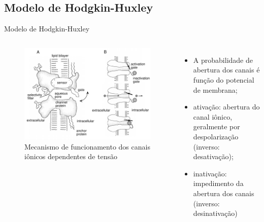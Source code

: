 \subsection{Modelo de Hodgkin-Huxley}
\begin{frame}{Modelo de Hodgkin-Huxley}
	\begin{columns}[t]
		\column{5cm}
			\begin{figure}[htb!]
				\centering
				\caption{Mecanismo de funcionamento dos canais iônicos dependentes de tensão}
				\label{fig:canais}
				\includegraphics[width=0.9\linewidth]{figs/canais}
			\end{figure}
		\column{5cm}
		\begin{itemize}
			\item A probabilidade de abertura dos canais é função do potencial de membrana;
			\item ativação: abertura do canal iônico, geralmente por despolarização (inverso: desativação);
			\item inativação: impedimento da abertura dos canais (inverso: desinativação)
		\end{itemize}
	\end{columns}
\end{frame}


